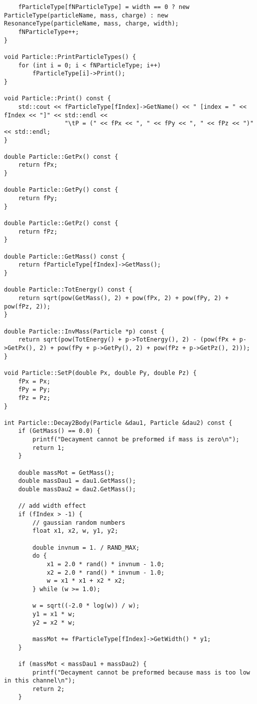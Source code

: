 \documentclass{article}
\begin{document}
\begin{verbatim}
    fParticleType[fNParticleType] = width == 0 ? new ParticleType(particleName, mass, charge) : new ResonanceType(particleName, mass, charge, width);
    fNParticleType++;
}

void Particle::PrintParticleTypes() {
    for (int i = 0; i < fNParticleType; i++)
        fParticleType[i]->Print();
}

void Particle::Print() const {
    std::cout << fParticleType[fIndex]->GetName() << " [index = " << fIndex << "]" << std::endl <<
                 "\tP = (" << fPx << ", " << fPy << ", " << fPz << ")" << std::endl;
}

double Particle::GetPx() const {
    return fPx;
}

double Particle::GetPy() const {
    return fPy;
}

double Particle::GetPz() const {
    return fPz;
}

double Particle::GetMass() const {
    return fParticleType[fIndex]->GetMass();
}

double Particle::TotEnergy() const {
    return sqrt(pow(GetMass(), 2) + pow(fPx, 2) + pow(fPy, 2) + pow(fPz, 2));
}

double Particle::InvMass(Particle *p) const {
    return sqrt(pow(TotEnergy() + p->TotEnergy(), 2) - (pow(fPx + p->GetPx(), 2) + pow(fPy + p->GetPy(), 2) + pow(fPz + p->GetPz(), 2)));
}

void Particle::SetP(double Px, double Py, double Pz) {
    fPx = Px;
    fPy = Py;
    fPz = Pz;
}

int Particle::Decay2Body(Particle &dau1, Particle &dau2) const {
    if (GetMass() == 0.0) {
        printf("Decayment cannot be preformed if mass is zero\n");
        return 1;
    }

    double massMot = GetMass();
    double massDau1 = dau1.GetMass();
    double massDau2 = dau2.GetMass();

    // add width effect
    if (fIndex > -1) {
        // gaussian random numbers
        float x1, x2, w, y1, y2;

        double invnum = 1. / RAND_MAX;
        do {
            x1 = 2.0 * rand() * invnum - 1.0;
            x2 = 2.0 * rand() * invnum - 1.0;
            w = x1 * x1 + x2 * x2;
        } while (w >= 1.0);

        w = sqrt((-2.0 * log(w)) / w);
        y1 = x1 * w;
        y2 = x2 * w;

        massMot += fParticleType[fIndex]->GetWidth() * y1;
    }

    if (massMot < massDau1 + massDau2) {
        printf("Decayment cannot be preformed because mass is too low in this channel\n");
        return 2;
    }


\end{verbatim}
\end{document}
